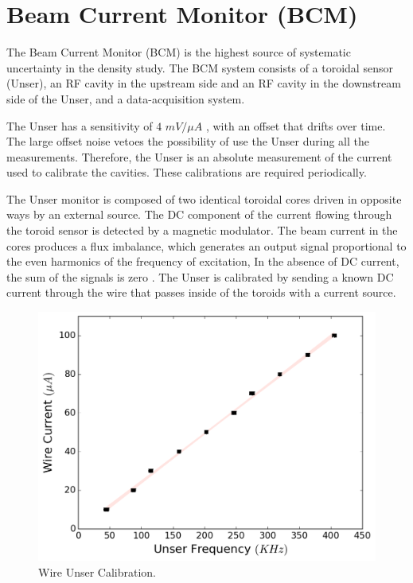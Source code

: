 \documentclass[final,5p,times,twocolumn]{elsarticle}
\begin{document}
\section{Beam Current Monitor (BCM)}

The Beam Current Monitor (BCM) is the highest source of systematic uncertainty in the density study. The BCM system consists of a toroidal sensor (Unser), an RF cavity in the upstream side and an RF cavity in the downstream side of the Unser, and a data-acquisition system.  

The Unser has a sensitivity of $4$ $mV/\mu A$ \cite{denard}, with an offset that drifts over time. The large offset noise vetoes the possibility of use the Unser during all the measurements. Therefore, the Unser is an absolute measurement of the current used to calibrate the cavities. These calibrations are required periodically.

The Unser monitor is composed of two identical toroidal cores driven in opposite ways by an external source.  The DC component of the current flowing through the toroid sensor is detected by a magnetic modulator. The beam current in the cores produces a flux imbalance, which generates an output signal proportional to the even harmonics of the frequency of excitation, In the absence of DC current, the sum of the signals is zero \cite{denard}. The Unser is calibrated by sending a known DC current through the wire that passes inside of the toroids with a current source.  


\begin{figure}[htbp]
    \centering
    \includegraphics[width=\linewidth]{images/unser_calibration.pdf}
    \caption{Wire Unser Calibration.}
    \label{fig:unser_cal}
\end{figure}
  
\end{document}
